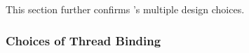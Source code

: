 This section further confirms \NM{}'s multiple design choices.

\subsubsection{Choices of Thread Binding}
\label{sec: threadbinding}



